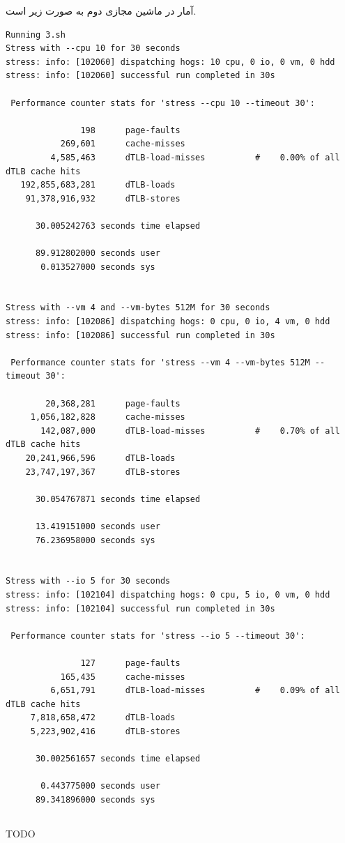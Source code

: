 \documentclass{article}
\begin{document}
آمار در ماشین مجازی دوم به صورت زیر است.
\begin{latin}
\begin{lstlisting}
Running 3.sh
Stress with --cpu 10 for 30 seconds
stress: info: [102060] dispatching hogs: 10 cpu, 0 io, 0 vm, 0 hdd
stress: info: [102060] successful run completed in 30s

 Performance counter stats for 'stress --cpu 10 --timeout 30':

               198      page-faults                                                 
           269,601      cache-misses                                                
         4,585,463      dTLB-load-misses          #    0.00% of all dTLB cache hits 
   192,855,683,281      dTLB-loads                                                  
    91,378,916,932      dTLB-stores                                                 

      30.005242763 seconds time elapsed

      89.912802000 seconds user
       0.013527000 seconds sys


Stress with --vm 4 and --vm-bytes 512M for 30 seconds
stress: info: [102086] dispatching hogs: 0 cpu, 0 io, 4 vm, 0 hdd
stress: info: [102086] successful run completed in 30s

 Performance counter stats for 'stress --vm 4 --vm-bytes 512M --timeout 30':

        20,368,281      page-faults                                                 
     1,056,182,828      cache-misses                                                
       142,087,000      dTLB-load-misses          #    0.70% of all dTLB cache hits 
    20,241,966,596      dTLB-loads                                                  
    23,747,197,367      dTLB-stores                                                 

      30.054767871 seconds time elapsed

      13.419151000 seconds user
      76.236958000 seconds sys


Stress with --io 5 for 30 seconds
stress: info: [102104] dispatching hogs: 0 cpu, 5 io, 0 vm, 0 hdd
stress: info: [102104] successful run completed in 30s

 Performance counter stats for 'stress --io 5 --timeout 30':

               127      page-faults                                                 
           165,435      cache-misses                                                
         6,651,791      dTLB-load-misses          #    0.09% of all dTLB cache hits 
     7,818,658,472      dTLB-loads                                                  
     5,223,902,416      dTLB-stores                                                 

      30.002561657 seconds time elapsed

       0.443775000 seconds user
      89.341896000 seconds sys
\end{lstlisting}
\end{latin}

\subsection{}
TODO
\end{document}
